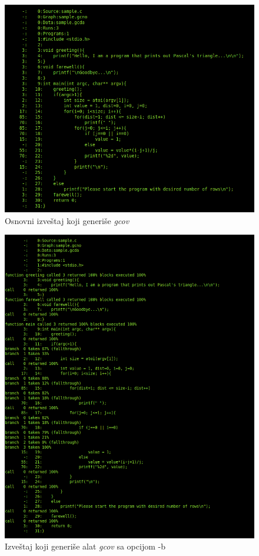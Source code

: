 \documentclass[12pt,oneside]{memoir}
\newcommand{\strano}[1]{\textit{#1}}
\begin{document}
\begin{figure}[!ht]
  \centering
  \includegraphics[width=\textwidth]{img/report_simple.png}
  \caption{Osnovni izveštaj koji generiše \strano{gcov}}
  \label{fig:report}
\end{figure}

\begin{figure}[!ht]
  \centering
  \includegraphics[width=\textwidth]{img/report_branch.png}
  \caption{Izveštaj koji generiše alat \strano{gcov}    sa opcijom -b}
  \label{fig:report1}
\end{figure}
\end{document}
